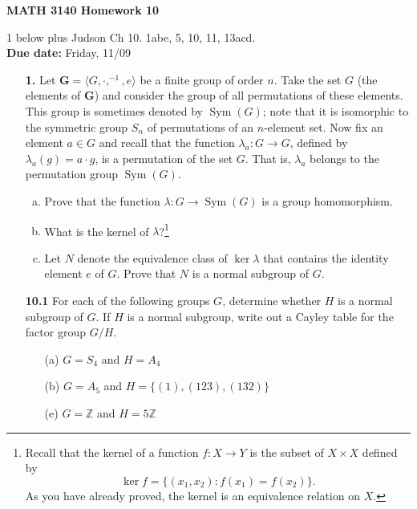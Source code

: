 \documentclass[12pt,reqno]{amsart}
\newcommand{\bG}{\ensuremath{\mathbf{G}}}
\newcommand{\<}{\ensuremath{\langle}}
\renewcommand{\>}{\ensuremath{\rangle}}
\newcommand{\Sym}{\ensuremath{\operatorname{Sym}}}
\newcommand{\subject}{MATH\xspace}
\newcommand{\coursenumber}{3140\xspace}
\begin{document}
\thispagestyle{empty}

\noindent \textbf{\subject \coursenumber Homework 10}

\smallskip

 1 below plus Judson Ch 10. 1abe, 5, 10, 11, 13acd.\\
{\bf Due date:} Friday, 11/09


\medskip

\begin{enumerate}
\item[{\bf 1.}] Let $\bG = \<G, \cdot, ^{-1}, e\>$ be a finite group of order $n$.  
Take the set $G$ (the elements of $\bG$) and consider the group of all
permutations of these elements.  This group is sometimes denoted by $\Sym(G)$;
note that it is isomorphic to the symmetric group $S_n$ of permutations of
an $n$-element set.
Now fix an element $a\in G$ and recall that the function
$\lambda_a: G \rightarrow G$, defined by $\lambda_a(g) = a\cdot g$, is a
permutation of the set $G$.  That is, $\lambda_a$ belongs to the
permutation group $\Sym(G)$.
\begin{enumerate}[(a)]
\item 
Prove that the function $\lambda: G \rightarrow \Sym(G)$ is a group
homomorphism.  
\medskip
\item What is the kernel of $\lambda$?\footnote{Recall that the kernel of a function $f: X \rightarrow Y$ is the subset of
  $X\times X$ defined by 
\[
\ker f = \{(x_1,x_2) : f(x_1) = f(x_2)\}.
\]
As you have already proved, the kernel is an equivalence relation on $X$.}
\medskip
\item Let $N$ denote the equivalence class of $\ker\lambda$ that contains the
  identity element $e$ of $G$.  Prove that $N$ is a normal subgroup of $G$.
\end{enumerate}

\vfill

\item[{\bf 10.1}] For each of the following groups $G$, determine whether $H$ is a normal
subgroup of $G$. If $H$ is a normal subgroup, write out a Cayley table
for the factor group $G/H$.
\begin{enumerate}
\item[(a)]
$G = S_4$ and $H = A_4$
 \item[(b)]
$G = A_5$ and $H = \{ (1), (123), (132) \}$
\item[(e)]
$G = {\mathbb Z}$ and $H = 5 {\mathbb Z}$
\end{enumerate}


\end{enumerate}
\end{document}
